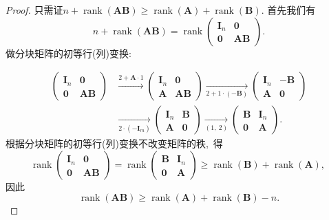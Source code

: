 \begin{proof}
	只需证$n+\operatorname{rank}(\boldsymbol{AB})\geqslant\operatorname{rank}(\boldsymbol{A})+\operatorname{rank}(\boldsymbol{B}).$
	首先我们有
	$$n+\operatorname{rank}(\boldsymbol{AB})=\operatorname{rank}\begin{pmatrix}
		\boldsymbol{I}_n&\boldsymbol{0}\\
		\boldsymbol{0}&\boldsymbol{AB}
	\end{pmatrix}.$$
	做分块矩阵的初等行(列)变换:
	
	$$\begin{aligned}\begin{pmatrix}
			\boldsymbol{I}_n & \boldsymbol{0}\\
			\boldsymbol{0}   & \boldsymbol{AB}
		\end{pmatrix}
		&\xrightarrow{2+\boldsymbol{A}\cdot 1}\begin{pmatrix}
			\boldsymbol{I}_n & \boldsymbol{0}\\
			\boldsymbol{A}   & \boldsymbol{AB}
		\end{pmatrix}
		\xrightarrow[2+1\cdot(-\boldsymbol{B})]{}\begin{pmatrix}
			\boldsymbol{I}_n & -\boldsymbol{B}\\
			\boldsymbol{A}   & \boldsymbol{0}
		\end{pmatrix}\\
		&\xrightarrow[2\cdot(-\boldsymbol{I}_m)]{}\begin{pmatrix}
			\boldsymbol{I}_n & \boldsymbol{B}\\
			\boldsymbol{A}   & \boldsymbol{0}
		\end{pmatrix}
		\xrightarrow[(1,\ 2)]{}\begin{pmatrix}
			\boldsymbol{B}   &\boldsymbol{I}_n\\
			\boldsymbol{0}   &\boldsymbol{A}
		\end{pmatrix}.
	\end{aligned}$$
	根据分块矩阵的初等行(列)变换不改变矩阵的秩,\ 得
	$$\operatorname{rank}\begin{pmatrix}
		\boldsymbol{I}_n & \boldsymbol{0}\\
		\boldsymbol{0}   & \boldsymbol{AB}
	\end{pmatrix}=\operatorname{rank}\begin{pmatrix}
		\boldsymbol{B}   & \boldsymbol{I}_n\\
		\boldsymbol{0}   & \boldsymbol{A}
	\end{pmatrix}\geqslant\operatorname{rank}(\boldsymbol{B})+\operatorname{rank}(\boldsymbol{A}),\ $$
	因此
	$$\operatorname{rank}(\boldsymbol{AB})\geqslant\operatorname{rank}(\boldsymbol{A})+\operatorname{rank}(\boldsymbol{B})-n.$$
\end{proof}
